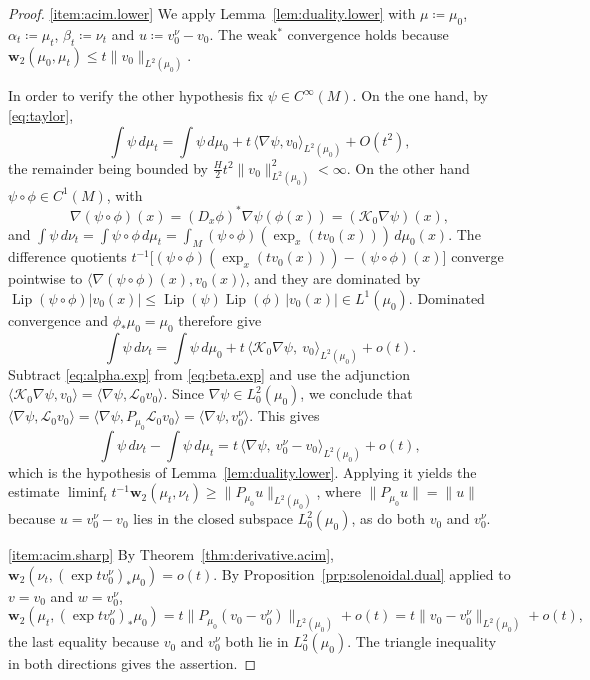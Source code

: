 \documentclass[11pt,reqno]{amsart}
\theoremstyle{plain}
\theoremstyle{definition}
\newcommand{\dw}{\mathbf{w}_2}
\newcommand{\Koop}{\mathcal{K}}
\newcommand{\Transf}{\mathcal{L}}
\DeclareMathOperator{\Lip}{Lip}
\begin{document}
\begin{proof}
    \ref{item:acim.lower}
    We apply Lemma~\ref{lem:duality.lower} with \( \mu\coloneqq\mu_0 \), \( \alpha_t\coloneqq\mu_t \), \( \beta_t\coloneqq\nu_t \) and \( u\coloneqq v_0^\nu-v_0 \).
    The weak\( ^\ast \) convergence holds because \( \dw(\mu_0,\mu_t)\le t\lVert v_0\rVert_{L^2(\mu_0)} \).

    In order to verify the other hypothesis fix \( \psi\in C^\infty(M) \).
    On the one hand, by \eqref{eq:taylor},
    \begin{equation}\label{eq:alpha.exp}
        \int\psi\,d\mu_t=\int\psi\,d\mu_0+t\,\langle\nabla\psi,v_0\rangle_{L^2(\mu_0)}+O(t^2),
    \end{equation}
    the remainder being bounded by \( \tfrac{H}{2}t^2\lVert v_0\rVert^2_{L^2(\mu_0)}<\infty \).
    On the other hand \( \psi\circ\phi\in C^1(M) \), with
    \[
        \nabla(\psi\circ\phi)(x)=(D_x\phi)^{\!*}\nabla\psi\left(\phi(x)\right)=\left(\Koop_0\nabla\psi\right)(x),
    \]
    and \( \int\psi\,d\nu_t=\int\psi\circ\phi\,d\mu_t=\int_M(\psi\circ\phi)\left(\exp_x(tv_0(x))\right)\,d\mu_0(x) \).
    The difference quotients \( t^{-1}\big[(\psi\circ\phi)(\exp_x(tv_0(x)))-(\psi\circ\phi)(x)\big] \) converge pointwise to \( \langle\nabla(\psi\circ\phi)(x),v_0(x)\rangle \), and they are dominated by \( \Lip(\psi\circ\phi)\lvert v_0(x)\rvert\le \Lip(\psi)\Lip(\phi)\,\lvert v_0(x)\rvert\in L^1(\mu_0) \).
    Dominated convergence and \( \phi_\ast\mu_0=\mu_0 \) therefore give
    \begin{equation}\label{eq:beta.exp}
        \int\psi\,d\nu_t=\int\psi\,d\mu_0+t\,\big\langle\Koop_0\nabla\psi,\ v_0\big\rangle_{L^2(\mu_0)}+o(t).
    \end{equation}
    Subtract \eqref{eq:alpha.exp} from \eqref{eq:beta.exp} and use the adjunction \( \langle\Koop_0\nabla\psi,v_0\rangle=\langle\nabla\psi,\Transf_0v_0\rangle \).
    Since \( \nabla\psi\in L^2_0(\mu_0) \), we conclude that \( \langle\nabla\psi,\Transf_0v_0\rangle=\langle\nabla\psi,P_{\mu_0}\Transf_0v_0\rangle=\langle\nabla\psi,v_0^\nu\rangle \).
    This gives
    \[
        \int\psi\,d\nu_t-\int\psi\,d\mu_t=t\,\big\langle\nabla\psi,\ v_0^\nu-v_0\big\rangle_{L^2(\mu_0)}+o(t),
    \]
    which is the hypothesis of Lemma~\ref{lem:duality.lower}.
    Applying it yields the estimate \( \liminf_tt^{-1}\dw(\mu_t,\nu_t)\ge\lVert P_{\mu_0}u\rVert_{L^2(\mu_0)} \), where \( \lVert P_{\mu_0}u\rVert=\lVert u\rVert \) because \( u=v_0^\nu-v_0 \) lies in the closed subspace \( L^2_0(\mu_0) \), as do both \( v_0 \) and \( v_0^\nu \).

    \ref{item:acim.sharp}
    By Theorem~\ref{thm:derivative.acim}, \( \dw\left(\nu_t,(\exp tv_0^\nu)_\ast\mu_0\right)=o(t) \).
    By Proposition~\ref{prp:solenoidal.dual} applied to \( v=v_0 \) and \( w=v_0^\nu \),
    \[
        \dw\left(\mu_t,(\exp tv_0^\nu)_\ast\mu_0\right)=t\big\lVert P_{\mu_0}(v_0-v_0^\nu)\big\rVert_{L^2(\mu_0)}+o(t)=t\big\lVert v_0-v_0^\nu\big\rVert_{L^2(\mu_0)}+o(t),
    \]
    the last equality because \( v_0 \) and \( v_0^\nu \) both lie in \( L^2_0(\mu_0) \).
    The triangle inequality in both directions gives the assertion.
\end{proof}
\end{document}
